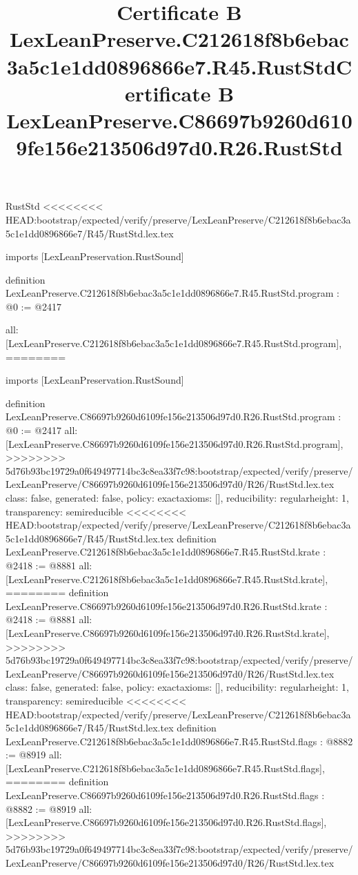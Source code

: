 \begin{lexlean}{RustStd}
<<<<<<<< HEAD:bootstrap/expected/verify/preserve/LexLeanPreserve/C212618f8b6ebac3a5c1e1dd0896866e7/R45/RustStd.lex.tex
\title{Certificate B LexLeanPreserve.C212618f8b6ebac3a5c1e1dd0896866e7.R45.RustStd}
\begin{coremodule}
imports [LexLeanPreservation.RustSound]

definition LexLeanPreserve.C212618f8b6ebac3a5c1e1dd0896866e7.R45.RustStd.program : @0 := @2417 {
  all: [LexLeanPreserve.C212618f8b6ebac3a5c1e1dd0896866e7.R45.RustStd.program],
========
\title{Certificate B LexLeanPreserve.C86697b9260d6109fe156e213506d97d0.R26.RustStd}
\begin{coremodule}
imports [LexLeanPreservation.RustSound]

definition LexLeanPreserve.C86697b9260d6109fe156e213506d97d0.R26.RustStd.program : @0 := @2417 {
  all: [LexLeanPreserve.C86697b9260d6109fe156e213506d97d0.R26.RustStd.program],
>>>>>>>> 5d76b93bc19729a0f649497714bc3c8ea33f7c98:bootstrap/expected/verify/preserve/LexLeanPreserve/C86697b9260d6109fe156e213506d97d0/R26/RustStd.lex.tex
  class: false,
  generated: false,
  policy: exact{axioms: []},
  reducibility: regular{height: 1},
  transparency: semireducible
}
<<<<<<<< HEAD:bootstrap/expected/verify/preserve/LexLeanPreserve/C212618f8b6ebac3a5c1e1dd0896866e7/R45/RustStd.lex.tex
definition LexLeanPreserve.C212618f8b6ebac3a5c1e1dd0896866e7.R45.RustStd.krate : @2418 := @8881 {
  all: [LexLeanPreserve.C212618f8b6ebac3a5c1e1dd0896866e7.R45.RustStd.krate],
========
definition LexLeanPreserve.C86697b9260d6109fe156e213506d97d0.R26.RustStd.krate : @2418 := @8881 {
  all: [LexLeanPreserve.C86697b9260d6109fe156e213506d97d0.R26.RustStd.krate],
>>>>>>>> 5d76b93bc19729a0f649497714bc3c8ea33f7c98:bootstrap/expected/verify/preserve/LexLeanPreserve/C86697b9260d6109fe156e213506d97d0/R26/RustStd.lex.tex
  class: false,
  generated: false,
  policy: exact{axioms: []},
  reducibility: regular{height: 1},
  transparency: semireducible
}
<<<<<<<< HEAD:bootstrap/expected/verify/preserve/LexLeanPreserve/C212618f8b6ebac3a5c1e1dd0896866e7/R45/RustStd.lex.tex
definition LexLeanPreserve.C212618f8b6ebac3a5c1e1dd0896866e7.R45.RustStd.flags : @8882 := @8919 {
  all: [LexLeanPreserve.C212618f8b6ebac3a5c1e1dd0896866e7.R45.RustStd.flags],
========
definition LexLeanPreserve.C86697b9260d6109fe156e213506d97d0.R26.RustStd.flags : @8882 := @8919 {
  all: [LexLeanPreserve.C86697b9260d6109fe156e213506d97d0.R26.RustStd.flags],
>>>>>>>> 5d76b93bc19729a0f649497714bc3c8ea33f7c98:bootstrap/expected/verify/preserve/LexLeanPreserve/C86697b9260d6109fe156e213506d97d0/R26/RustStd.lex.tex
}}}
\end{coremodule}}
\end{coremodule}
\end{lexlean}
